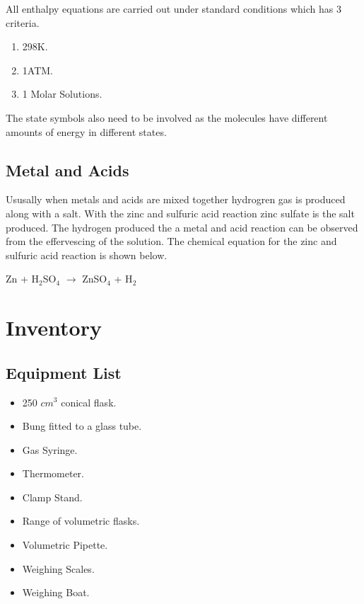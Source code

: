 All enthalpy equations are carried out under standard conditions which has 3 criteria.

\begin{enumerate}
\item 298K.
\item 1ATM.
\item 1 Molar Solutions.
\end{enumerate}

The state symbols also need to be involved as the molecules have different amounts of energy in different states.

	


	\subsection{Metal and Acids}

Ususally when metals and acids are mixed together hydrogren gas is produced along with a salt. With the zinc and sulfuric acid reaction zinc sulfate is the salt produced. The hydrogen produced the a metal and acid reaction can be observed from the effervescing of the solution. The chemical equation for the zinc and sulfuric acid reaction is shown below.

Zn + H$_2$SO$_4$ $\rightarrow$ ZnSO$_4$ + H$_2$




\section{Inventory}

	\subsection{Equipment List}
\begin{itemize}
\item 250 $cm^3$ conical flask.
\item Bung fitted to a glass tube.
\item Gas Syringe.
\item Thermometer.
\item Clamp Stand.
\item Range of volumetric flasks.
\item Volumetric Pipette.
\item Weighing Scales.
\item Weighing Boat.
\end{itemize}

